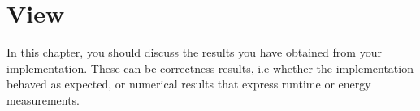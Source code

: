\chapter{View}
In this chapter, you should discuss the results you have obtained from your implementation.
These can be correctness results, i.e whether the implementation behaved as expected, or numerical results that express runtime or energy measurements.